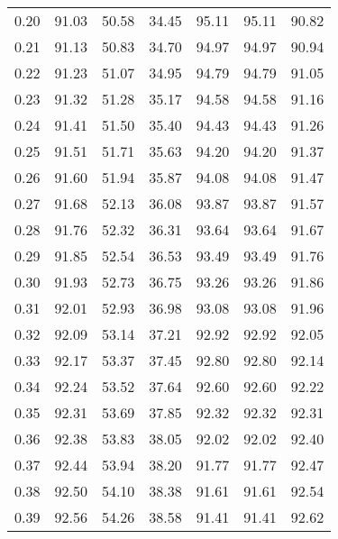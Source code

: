 \begin{tabular}{|c|c|c|c|c|c|c|}
      0.20 &     91.03 &     50.58 &      34.45 &   95.11 &      95.11 &         90.82 \\
      0.21 &     91.13 &     50.83 &      34.70 &   94.97 &      94.97 &         90.94 \\
      0.22 &     91.23 &     51.07 &      34.95 &   94.79 &      94.79 &         91.05 \\
      0.23 &     91.32 &     51.28 &      35.17 &   94.58 &      94.58 &         91.16 \\
      0.24 &     91.41 &     51.50 &      35.40 &   94.43 &      94.43 &         91.26 \\
      0.25 &     91.51 &     51.71 &      35.63 &   94.20 &      94.20 &         91.37 \\
      0.26 &     91.60 &     51.94 &      35.87 &   94.08 &      94.08 &         91.47 \\
      0.27 &     91.68 &     52.13 &      36.08 &   93.87 &      93.87 &         91.57 \\
      0.28 &     91.76 &     52.32 &      36.31 &   93.64 &      93.64 &         91.67 \\
      0.29 &     91.85 &     52.54 &      36.53 &   93.49 &      93.49 &         91.76 \\
      0.30 &     91.93 &     52.73 &      36.75 &   93.26 &      93.26 &         91.86 \\
      0.31 &     92.01 &     52.93 &      36.98 &   93.08 &      93.08 &         91.96 \\
      0.32 &     92.09 &     53.14 &      37.21 &   92.92 &      92.92 &         92.05 \\
      0.33 &     92.17 &     53.37 &      37.45 &   92.80 &      92.80 &         92.14 \\
      0.34 &     92.24 &     53.52 &      37.64 &   92.60 &      92.60 &         92.22 \\
      0.35 &     92.31 &     53.69 &      37.85 &   92.32 &      92.32 &         92.31 \\
      0.36 &     92.38 &     53.83 &      38.05 &   92.02 &      92.02 &         92.40 \\
      0.37 &     92.44 &     53.94 &      38.20 &   91.77 &      91.77 &         92.47 \\
      0.38 &     92.50 &     54.10 &      38.38 &   91.61 &      91.61 &         92.54 \\
      0.39 &     92.56 &     54.26 &      38.58 &   91.41 &      91.41 &         92.62 \\

\end{tabular}

